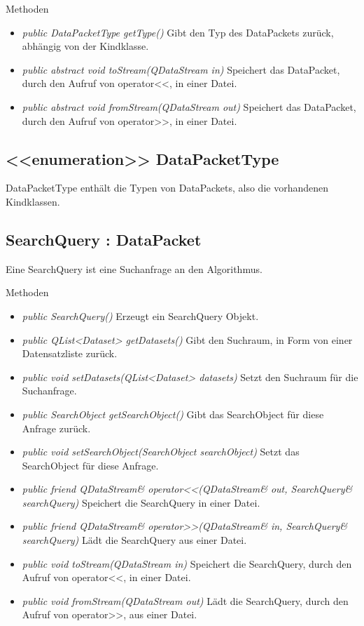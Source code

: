Methoden
\begin{itemize}
\item \textit{public DataPacketType getType()} Gibt den Typ des DataPackets zurück, abhängig von der Kindklasse.
\item \textit{public abstract void toStream(QDataStream in)} Speichert das DataPacket, durch den Aufruf von operator<<, in einer Datei.
\item \textit{public abstract void fromStream(QDataStream out)} Speichert das DataPacket, durch den Aufruf von operator>>, in einer Datei.
\end{itemize}

\subsection*{<<enumeration>> DataPacketType}
DataPacketType enthält die Typen von DataPackets, also die vorhandenen Kindklassen.

\subsection*{SearchQuery : DataPacket}
Eine SearchQuery ist eine Suchanfrage an den Algorithmus.

Methoden
\begin{itemize}
\item \textit{public SearchQuery()} Erzeugt ein SearchQuery Objekt.
\item \textit{public QList<Dataset> getDatasets()} Gibt den Suchraum, in Form von einer Datensatzliste zurück.
\item \textit{public void setDatasets(QList<Dataset> datasets)} Setzt den Suchraum für die Suchanfrage.
\item \textit{public SearchObject getSearchObject()} Gibt das SearchObject für diese Anfrage zurück.
\item \textit{public void setSearchObject(SearchObject searchObject)} Setzt das SearchObject für diese Anfrage.
\item \textit{public friend QDataStream\& operator<<(QDataStream\& out, SearchQuery\& searchQuery)} Speichert die SearchQuery in einer Datei.
\item \textit{public friend QDataStream\& operator>>(QDataStream\& in, SearchQuery\& searchQuery)} Lädt die SearchQuery aus einer Datei.
\item \textit{public void toStream(QDataStream in)} Speichert die SearchQuery, durch den Aufruf von operator<<, in einer Datei.
\item \textit{public void fromStream(QDataStream out)} Lädt die SearchQuery, durch den Aufruf von operator>>, aus einer Datei.
\end{itemize}


